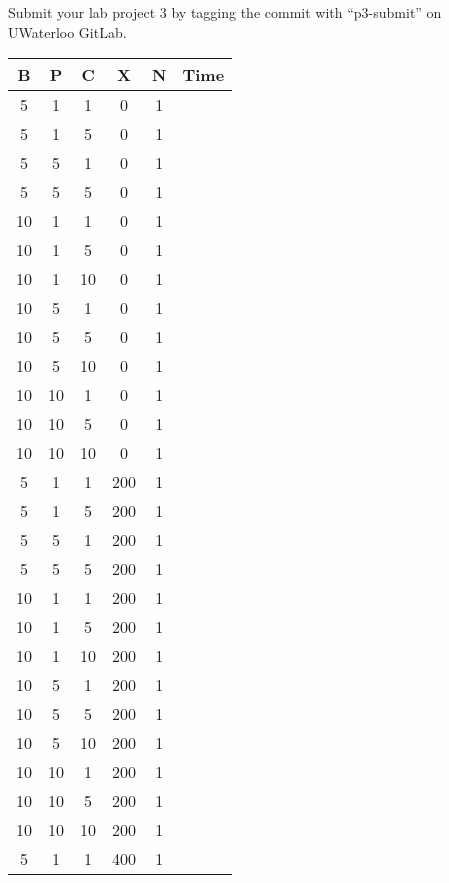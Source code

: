 \begin{enumerate}
  
Submit your lab project 3 by tagging the commit with ``p3-submit'' on UWaterloo GitLab.
\begin{table}[H]
\begin{center}
\begin{tabular}{|c|c|c|c|c|c|}
\hline
B   & P   & C   & X   & N   &Time   \\ \hline 
5   & 1   & 1   & 0   & 1   &   \\ \hline
5   & 1   & 5   & 0   & 1   &   \\ \hline
5   & 5   & 1   & 0   & 1   &   \\ \hline
5   & 5   & 5   & 0   & 1   &   \\ \hline
10   & 1   & 1   & 0   & 1   &   \\ \hline
10   & 1   & 5   & 0   & 1   &   \\ \hline
10   & 1   & 10   & 0   & 1   &   \\ \hline
10   & 5   & 1   & 0   & 1   &   \\ \hline
10   & 5   & 5   & 0   & 1   &   \\ \hline
10   & 5   & 10   & 0   & 1   &   \\ \hline
10   & 10   & 1   & 0   & 1   &   \\ \hline
10   & 10   & 5   & 0   & 1   &   \\ \hline
10   & 10   & 10   & 0   & 1   &   \\ \hline
5   & 1   & 1   & 200   & 1   &   \\ \hline
5   & 1   & 5   & 200   & 1   &   \\ \hline
5   & 5   & 1   & 200   & 1   &   \\ \hline
5   & 5   & 5   & 200   & 1   &   \\ \hline
10   & 1   & 1   & 200   & 1   &   \\ \hline
10   & 1   & 5   & 200   & 1   &   \\ \hline
10   & 1   & 10   & 200   & 1   &   \\ \hline
10   & 5   & 1   & 200   & 1   &   \\ \hline
10   & 5   & 5   & 200   & 1   &   \\ \hline
10   & 5   & 10   & 200   & 1   &   \\ \hline
10   & 10   & 1   & 200   & 1   &   \\ \hline
10   & 10   & 5   & 200   & 1   &   \\ \hline
10   & 10   & 10   & 200   & 1   &   \\ \hline
5   & 1   & 1   & 400   & 1   &   \\ \hline

\end{tabular}
\end{center}
\end{table}
\end{enumerate}
